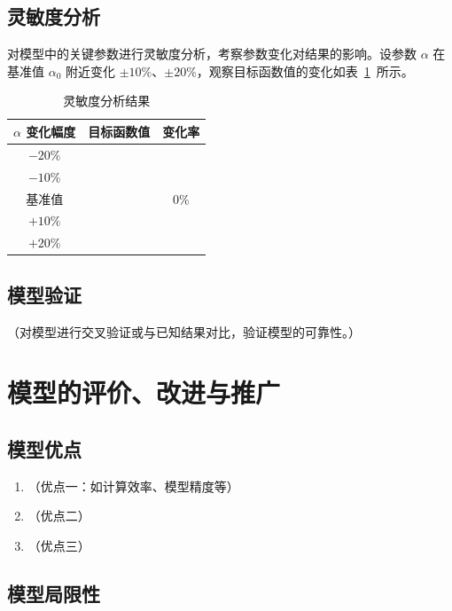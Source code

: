 \documentclass[12pt, a4paper]{article}
\begin{document}
\subsection{灵敏度分析}

对模型中的关键参数进行灵敏度分析，考察参数变化对结果的影响。设参数 $\alpha$ 在基准值 $\alpha_0$ 附近变化 $\pm 10\%$、$\pm 20\%$，观察目标函数值的变化如表~\ref{tab:sensitivity}~所示。

\begin{table}[H]
\centering
\caption{灵敏度分析结果}
\label{tab:sensitivity}
\begin{tabular}{ccc}
\toprule
$\alpha$ 变化幅度 & 目标函数值 & 变化率 \\
\midrule
$-20\%$ & & \\
$-10\%$ & & \\
基准值   & & 0\% \\
$+10\%$ & & \\
$+20\%$ & & \\
\bottomrule
\end{tabular}
\end{table}

\subsection{模型验证}

（对模型进行交叉验证或与已知结果对比，验证模型的可靠性。）

\section{模型的评价、改进与推广}

\subsection{模型优点}

\begin{enumerate}
    \item （优点一：如计算效率、模型精度等）
    \item （优点二）
    \item （优点三）
\end{enumerate}

\subsection{模型局限性}
\end{document}
